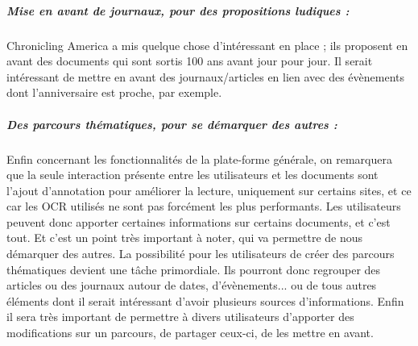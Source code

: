     \subparagraph{Mise en avant de journaux, pour des propositions ludiques :}
    Chronicling America a mis quelque chose d’intéressant en place ; ils proposent en avant des documents
    qui sont sortis 100 ans avant jour pour jour. Il serait intéressant de mettre en avant des journaux/articles
    en lien avec des évènements dont l’anniversaire est proche, par exemple.

    \subparagraph{Des parcours thématiques, pour se démarquer des autres :}
    Enfin concernant les fonctionnalités de la plate-forme générale, on remarquera que la seule interaction présente
    entre les utilisateurs et les documents sont l’ajout d’annotation pour améliorer la lecture, uniquement sur certains
    sites, et ce car les OCR utilisés ne sont pas forcément les plus performants. Les utilisateurs peuvent donc apporter
    certaines informations sur certains documents, et c’est tout. Et c’est un point très important à noter, qui va permettre
    de nous démarquer des autres.  La possibilité pour les utilisateurs de créer des parcours thématiques devient une tâche
    primordiale. Ils pourront donc regrouper des articles ou des journaux autour de dates, d’évènements... ou de tous autres
    éléments dont il serait intéressant d’avoir plusieurs sources d’informations. Enfin il sera très important de permettre
    à divers utilisateurs d’apporter des modifications sur un parcours, de partager ceux-ci, de les mettre en avant.
